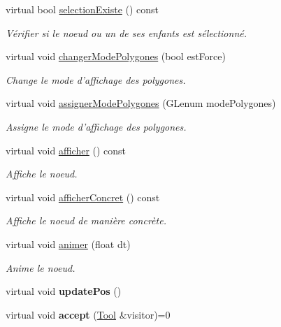\begin{DoxyCompactItemize}
virtual bool \hyperlink{group__inf2990_gae7c702b865babd20ddd30dd776adc82b}{selection\-Existe} () const 
\begin{DoxyCompactList}\small\item\em Vérifier si le noeud ou un de ses enfants est sélectionné. \end{DoxyCompactList}\item 
virtual void \hyperlink{group__inf2990_ga13a97383c2081b405fc2e0d97cff80df}{changer\-Mode\-Polygones} (bool est\-Force)
\begin{DoxyCompactList}\small\item\em Change le mode d'affichage des polygones. \end{DoxyCompactList}\item 
virtual void \hyperlink{group__inf2990_ga726d9d0a524939f405aeeac3fbd06666}{assigner\-Mode\-Polygones} (G\-Lenum mode\-Polygones)
\begin{DoxyCompactList}\small\item\em Assigne le mode d'affichage des polygones. \end{DoxyCompactList}\item 
virtual void \hyperlink{group__inf2990_gae789271ea41032d717b8e4300be05de0}{afficher} () const 
\begin{DoxyCompactList}\small\item\em Affiche le noeud. \end{DoxyCompactList}\item 
virtual void \hyperlink{group__inf2990_ga330df455c8b08440d3c8e64d0a480391}{afficher\-Concret} () const 
\begin{DoxyCompactList}\small\item\em Affiche le noeud de manière concrète. \end{DoxyCompactList}\item 
virtual void \hyperlink{group__inf2990_gadc6ebe69894dbb682fdd0ecb1b6c11e9}{animer} (float dt)
\begin{DoxyCompactList}\small\item\em Anime le noeud. \end{DoxyCompactList}\item 
\hypertarget{class_noeud_abstrait_a783b22f2676ba894eed058c7cd2de8d8}{virtual void {\bfseries update\-Pos} ()}\label{class_noeud_abstrait_a783b22f2676ba894eed058c7cd2de8d8}

\item 
\hypertarget{class_noeud_abstrait_ac166d3266931e3bb81d4df1617108340}{virtual void {\bfseries accept} (\hyperlink{class_tool}{Tool} \&visitor)=0}\label{class_noeud_abstrait_ac166d3266931e3bb81d4df1617108340}


\end{DoxyCompactItemize}
